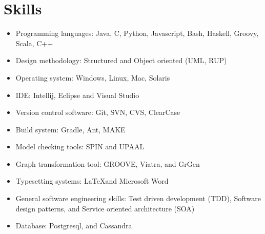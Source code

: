 \section{Skills}
\begin{itemize}
\item Programming languages: Java, C, Python, Javascript, Bash, Haskell, Groovy, Scala, C++ 

\item Design methodology: Structured and Object oriented (UML, RUP)

\item Operating system: Windows, Linux, Mac, Solaris

\item IDE: Intellij, Eclipse and Visual Studio

\item Version control software: Git, SVN, CVS, ClearCase

\item Build system: Gradle, Ant, MAKE

\item Model checking tools: SPIN and UPAAL

\item Graph transformation tool: GROOVE, Viatra, and GrGen

\item Typesetting systems: \LaTeX and Microsoft Word

\item General software engineering skills: Test driven development (TDD), Software design patterns, and Service oriented architecture (SOA)

\item Database: Postgresql, and Cassandra

\end{itemize}
